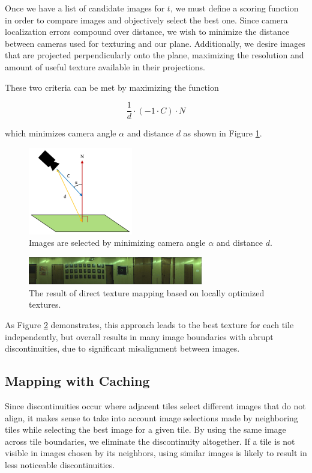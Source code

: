 \documentclass[10pt,twocolumn,letterpaper]{article}
\begin{document}
Once we have a list of candidate images for $t$, we must define a
scoring function in order to compare images and objectively select the
best one. Since camera localization errors compound over distance, we
wish to minimize the distance between cameras used for texturing and
our plane. Additionally, we desire images that are projected
perpendicularly onto the plane, maximizing the resolution and amount
of useful texture available in their projections.

These two criteria can be met by maximizing the function

\[
\frac{1}{d} \cdot (-1 \cdot C) \cdot N
\]

which minimizes camera angle $\alpha$ and distance $d$ as shown in
Figure \ref{fig:scoringFunction}.

\begin{figure}
  \centering
  \includegraphics[height=1.5in]{scoringFunction.pdf}
  \caption{Images are selected by minimizing camera angle $\alpha$ and
    distance $d$.}
  \label{fig:scoringFunction}
\end{figure}



\begin{figure}
  \centering
  \includegraphics[width=3in]{wall1_naive.jpg}
  \caption{The result of direct texture mapping based on locally
    optimized textures.}
  \label{fig:directMapping}
\end{figure}


As Figure \ref{fig:directMapping} demonstrates, this approach leads to
the best texture for each tile independently, but overall results in
many image boundaries with abrupt discontinuities, due to significant
misalignment between images.

\subsection{Mapping with Caching}
\label{sec:mappingWithCaching}
Since discontinuities occur where adjacent tiles select different
images that do not align, it makes sense to take into account image
selections made by neighboring tiles while selecting the best image
for a given tile. By using the same image across tile boundaries, we
eliminate the discontinuity altogether. If a tile is not visible in
images chosen by its neighbors, using similar images is likely to
result in less noticeable discontinuities.
\end{document}
